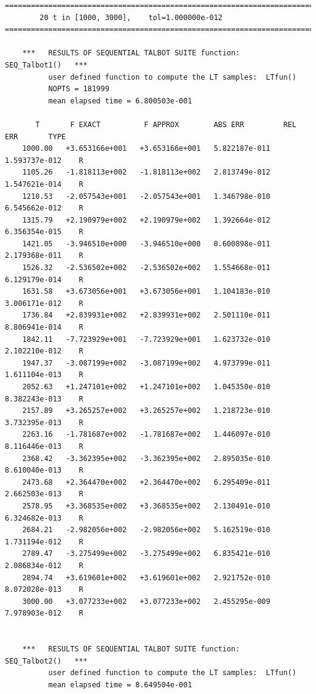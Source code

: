 \documentclass[a4paper,10pt]{report}%
\begin{document}
\begin{lstlisting}
====================================================================================
        20 t in [1000, 3000],    tol=1.000000e-012
====================================================================================

    ***   RESULTS OF SEQUENTIAL TALBOT SUITE function:      SEQ_Talbot1()   ***
          user defined function to compute the LT samples:  LTfun()
          NOPTS = 181999
          mean elapsed time = 6.800503e-001

       T       F EXACT          F APPROX        ABS ERR         REL ERR       TYPE
    1000.00   +3.653166e+001   +3.653166e+001   5.822187e-011   1.593737e-012    R
    1105.26   -1.818113e+002   -1.818113e+002   2.813749e-012   1.547621e-014    R
    1210.53   -2.057543e+001   -2.057543e+001   1.346798e-010   6.545662e-012    R
    1315.79   +2.190979e+002   +2.190979e+002   1.392664e-012   6.356354e-015    R
    1421.05   -3.946510e+000   -3.946510e+000   8.600898e-011   2.179368e-011    R
    1526.32   -2.536502e+002   -2.536502e+002   1.554668e-011   6.129179e-014    R
    1631.58   +3.673056e+001   +3.673056e+001   1.104183e-010   3.006171e-012    R
    1736.84   +2.839931e+002   +2.839931e+002   2.501110e-011   8.806941e-014    R
    1842.11   -7.723929e+001   -7.723929e+001   1.623732e-010   2.102210e-012    R
    1947.37   -3.087199e+002   -3.087199e+002   4.973799e-011   1.611104e-013    R
    2052.63   +1.247101e+002   +1.247101e+002   1.045350e-010   8.382243e-013    R
    2157.89   +3.265257e+002   +3.265257e+002   1.218723e-010   3.732395e-013    R
    2263.16   -1.781687e+002   -1.781687e+002   1.446097e-010   8.116446e-013    R
    2368.42   -3.362395e+002   -3.362395e+002   2.895035e-010   8.610040e-013    R
    2473.68   +2.364470e+002   +2.364470e+002   6.295409e-011   2.662503e-013    R
    2578.95   +3.368535e+002   +3.368535e+002   2.130491e-010   6.324682e-013    R
    2684.21   -2.982056e+002   -2.982056e+002   5.162519e-010   1.731194e-012    R
    2789.47   -3.275499e+002   -3.275499e+002   6.835421e-010   2.086834e-012    R
    2894.74   +3.619601e+002   +3.619601e+002   2.921752e-010   8.072028e-013    R
    3000.00   +3.077233e+002   +3.077233e+002   2.455295e-009   7.978903e-012    R


    ***   RESULTS OF SEQUENTIAL TALBOT SUITE function:      SEQ_Talbot2()   ***
          user defined function to compute the LT samples:  LTfun()
          mean elapsed time = 8.649504e-001


\end{lstlisting}
\end{document}
